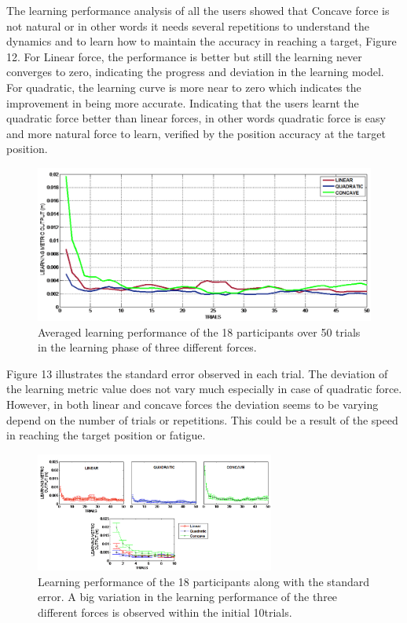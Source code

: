 The learning performance analysis of all the users showed that Concave force is not natural or in other words it needs several repetitions to understand the dynamics and to learn how to maintain the accuracy in reaching a target, Figure 12. For Linear force, the performance is better but still the learning never converges to zero, indicating the progress and deviation in the learning model. For quadratic, the learning curve is more near to zero which indicates the improvement in being more accurate. Indicating that the users learnt the quadratic force better than linear forces, in other words quadratic force is easy and more natural force to learn, verified by the position accuracy at the target position. 
%
\begin{figure}
	\centering
	\includegraphics[width=.7\textwidth]{Chie/figs/Figure12.png}
	\caption{Averaged learning performance of the 18 participants over 50 trials in the learning phase of three different forces.}
	\label{learning}
\end{figure}
Figure 13 illustrates the standard error observed in each trial. The deviation of the learning metric value does not vary much especially in case of quadratic force. However, in both linear and concave forces the deviation seems to be varying depend on the number of trials or repetitions. This could be a result of the speed in reaching the target position or fatigue.
%
\begin{figure}
	\centering
	\includegraphics[width=0.7\textwidth]{Chie/figs/Figure13.png}
	\caption{ Learning performance of the 18 participants along with the standard error. A big variation in the learning performance of the three different forces is observed within the initial 10trials.}
	\label{learnerror}
\end{figure}
